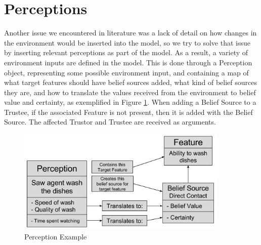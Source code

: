 \section{Perceptions}
Another issue we encountered in literature was a lack of detail on how changes in the environment would be inserted into the model, so we try to solve that issue by inserting relevant perceptions as part of the model. As a result, a variety of environment inputs are defined in the model. This is done through a Perception object, representing some possible environment input, and containing a map of what target features should have belief sources added, what kind of belief sources they are, and how to translate the values received from the environment to belief value and certainty, as exemplified in Figure \ref{fig:Perceptions Diagram}. When adding a Belief Source to a Trustee, if the associated Feature is not present, then it is added with the Belief Source. The affected Trustor and Trustee are received as arguments.

\begin{figure}[hbt]
    \centering
    \includegraphics[width=0.9\textwidth]{figures/PerceptionsDiagram.jpg}
    \caption{Perception Example}
    \label{fig:Perceptions Diagram}
\end{figure}



